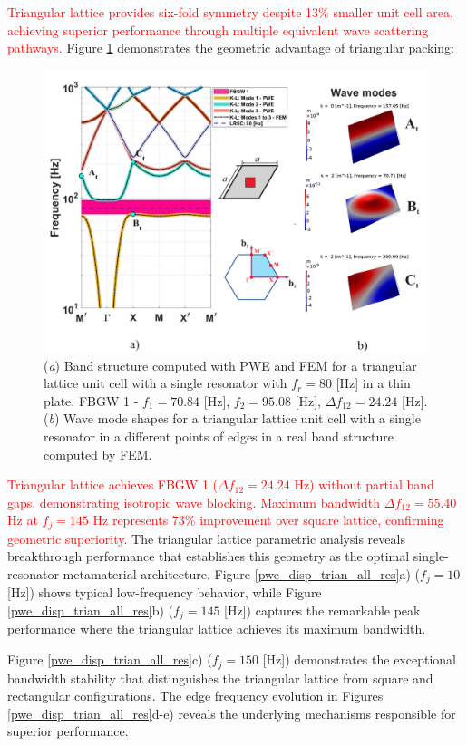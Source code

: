 \documentclass[review,numbers,sort&compress]{elsarticle}
\begin{document}
\textcolor{red}{Triangular lattice provides six-fold symmetry despite 13\% smaller unit cell area, achieving superior performance through multiple equivalent wave scattering pathways.} Figure \ref{pwe_fem_disp_modal_trian} demonstrates the geometric advantage of triangular packing:

\newpage
\begin{figure}[htb]
	\centering
	\includegraphics[width=.8\textwidth]{1_3_disp_frf_trian.pdf}
	\caption{(\textit{a}) Band structure computed with PWE and FEM for a triangular lattice unit cell with a single resonator with $f_r = 80$ [Hz] in a thin plate. FBGW 1 - $f_1 = 70.84$ [Hz], $f_2 = 95.08$ [Hz], $\Delta f_{12} = 24.24 $ [Hz]. (\textit{b}) Wave mode shapes for a triangular lattice unit cell with a single resonator in a different points of edges in a real band structure computed by FEM.}
	\label{pwe_fem_disp_modal_trian}
    \end{figure}

\textcolor{red}{Triangular lattice achieves FBGW 1 ($\Delta f_{12} = 24.24$ Hz) without partial band gaps, demonstrating isotropic wave blocking. Maximum bandwidth $\Delta f_{12} = 55.40$ Hz at $f_j = 145$ Hz represents 73\% improvement over square lattice, confirming geometric superiority.} The triangular lattice parametric analysis reveals breakthrough performance that establishes this geometry as the optimal single-resonator metamaterial architecture. Figure \ref{pwe_disp_trian_all_res}a) ($f_j = 10$ [Hz]) shows typical low-frequency behavior, while Figure \ref{pwe_disp_trian_all_res}b) ($f_j = 145$ [Hz]) captures the remarkable peak performance where the triangular lattice achieves its maximum bandwidth.

Figure \ref{pwe_disp_trian_all_res}c) ($f_j = 150$ [Hz]) demonstrates the exceptional bandwidth stability that distinguishes the triangular lattice from square and rectangular configurations. The edge frequency evolution in Figures \ref{pwe_disp_trian_all_res}d-e) reveals the underlying mechanisms responsible for superior performance.
\end{document}
